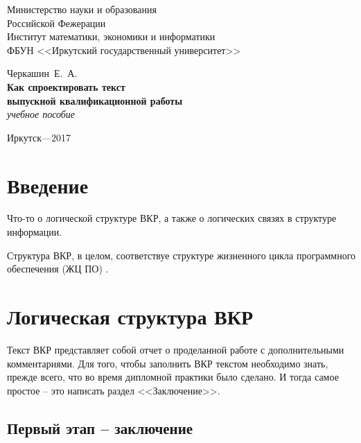 \documentclass[a4paper,14pt,final]{extreport}
\begin{document}
\thispagestyle{empty}
\begin{center}
  \small Министерство науки и образования\\
  Российской Фежерации \\
Институт математики, экономики и информатики\\
ФБУН <<Иркутский государственный университет>>
\end{center}
\vfill
\begin{center}
  Черкашин~Е.~А.\\[2em]
  {
  \Large\bfseries Как спроектировать текст\\
выпускной квалификационной работы\\
}
\vspace{1em}
\emph{учебное пособие}
\end{center}
\vspace{8em}
\vfill
\begin{center}
  Иркутск---2017
\end{center}
\mbox{}
\newpage

\tableofcontents

\chapter*{Введение}
\label{cha:inro}

Что-то о логической структуре ВКР, а также о логических связях в структуре информации.

Структура ВКР, в целом, соответствуе структуре жизненного цикла программного обеспечения (ЖЦ ПО) \cite{lifecycle}.

\chapter{Логическая структура ВКР}
\label{cha:logstru}

Текст ВКР представляет собой отчет о проделанной работе с дополнительными комментариями.  Для того, чтобы заполнить ВКР текстом необходимо знать, прежде всего, что во время дипломной практики было сделано.  И тогда самое простое -- это написать раздел <<Заключение>>.

\section{Первый этап -- заключение}
\label{sec:coclusion}
\end{document}
